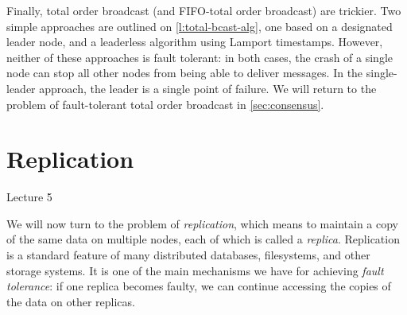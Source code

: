 Finally, total order broadcast (and FIFO-total order broadcast) are trickier.
Two simple approaches are outlined on \autoref{l:total-bcast-alg}, one based on a designated leader node, and a leaderless algorithm using Lamport timestamps.
However, neither of these approaches is fault tolerant: in both cases, the crash of a single node can stop all other nodes from being able to deliver messages.
In the single-leader approach, the leader is a single point of failure.
We will return to the problem of fault-tolerant total order broadcast in \autoref{sec:consensus}.


\section{Replication}\label{sec:replication}

\begin{frame}
    \begin{center}
        Lecture 5\\[2em]
        \Large{\color{darkblue}{Replication}}
    \end{center}
\end{frame}

We will now turn to the problem of \emph{replication}, which means to maintain a copy of the same data on multiple nodes, each of which is called a \emph{replica}.
Replication is a standard feature of many distributed databases, filesystems, and other storage systems.
It is one of the main mechanisms we have for achieving \emph{fault tolerance}: if one replica becomes faulty, we can continue accessing the copies of the data on other replicas.

